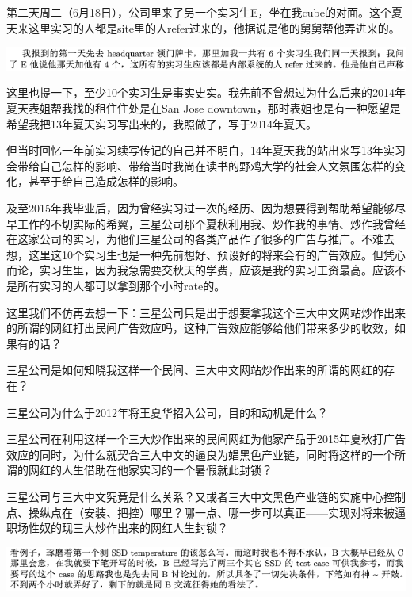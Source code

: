 \documentclass[9pt, b5paper]{article}
\begin{document}
第二天周二（6月18日），公司里来了另一个实习生E，坐在我cube的对面。这个夏天来这里实习的人都是site里的人refer过来的，他据说是他的舅舅帮他弄进来的。 

\begin{center}
\includegraphics[width=.9\linewidth]{./pic/backups_plans_20210505_113837.png}
\end{center}

这里也提一下，至少10个实习生是事实史实。我先前不曾想过为什么后来的2014年夏天表姐帮我找的租住住处是在San Jose downtown，那时表姐也是有一种愿望是希望我把13年夏天实习写出来的，我照做了，写于2014年夏天。

但当时回忆一年前实习续写传记的自己并不明白，14年夏天我的站出来写13年实习会带给自己怎样的影响、带给当时我尚在读书的野鸡大学的社会人文氛围怎样的变化，甚至于给自己造成怎样的影响。

及至2015年我毕业后，因为曾经实习过一次的经历、因为想要得到帮助希望能够尽早工作的不切实际的希翼，三星公司那个夏秋利用我、炒作我的事情、炒作我曾经在这家公司的实习，为他们三星公司的各类产品作了很多的广告与推广。不难去想，这里这10个实习生也是一种先前想好、预设好的将来会有的广告效应。但凭心而论，实习生里，因为我急需要交秋天的学费，应该是我的实习工资最高。应该不是所有实习的人都可以拿到那个小时rate的。

这里我们不仿再去想一下：三星公司只是出于想要拿我这个三大中文网站炒作出来的所谓的网红打出民间广告效应吗，这种广告效应能够给他们带来多少的收效，如果有的话？

三星公司是如何知晓我这样一个民间、三大中文网站炒作出来的所谓的网红的存在？

三星公司为什么于2012年将王夏华招入公司，目的和动机是什么？

三星公司在利用这样一个三大炒作出来的民间网红为他家产品于2015年夏秋打广告效应的同时，为什么就契合三大中文的逼良为娼黑色产业链，同时将这样的一个所谓的网红的人生借助在他家实习的一个暑假就此封锁？

三星公司与三大中文究竟是什么关系？又或者三大中文黑色产业链的实施中心控制点、操纵点在（安装、把控）哪里？哪一点、哪一步可以真正——实现对将来被逼职场性奴的现三大炒作出来的网红人生封锁？

\begin{center}
\includegraphics[width=.9\linewidth]{./pic/backups_plans_20210504_215646.png}
\end{center}
\end{document}
